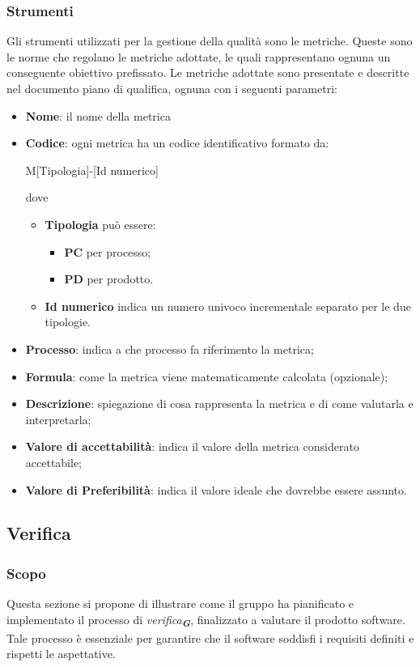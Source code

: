\subsubsection{Strumenti}
Gli strumenti utilizzati per la gestione della qualità sono le metriche.
Queste sono le norme che regolano le metriche adottate, le quali rappresentano ognuna un conseguente obiettivo prefissato.
Le metriche adottate sono presentate e descritte nel documento piano di qualifica, ognuna con i seguenti parametri:
\begin{itemize}
    \item \textbf{Nome}: il nome della metrica
    \item \textbf{Codice}: ogni metrica ha un codice identificativo formato da:
    \begin{center}
        M[Tipologia]-[Id numerico]
    \end{center}
    dove
    \begin{itemize}
        \item \textbf{Tipologia} può essere:
        \begin{itemize}
            \item \textbf{PC} per processo;
            \item \textbf{PD} per prodotto.
        \end{itemize}
        \item \textbf{Id numerico} indica un numero univoco incrementale separato per le due tipologie.
    \end{itemize}
    \item \textbf{Processo}: indica a che processo fa riferimento la metrica;
    \item \textbf{Formula}: come la metrica viene matematicamente calcolata (opzionale);
    \item \textbf{Descrizione}: spiegazione di cosa rappresenta la metrica e di come valutarla e interpretarla;
    \item \textbf{Valore di accettabilità}: indica il valore della metrica considerato accettabile;
    \item \textbf{Valore di Preferibilità}: indica il valore ideale che dovrebbe essere assunto.
\end{itemize}


\subsection{Verifica}
\label{sec:verifica}

\subsubsection{Scopo}
Questa sezione si propone di illustrare come il gruppo ha pianificato e implementato il processo di \emph{verifica}\textsubscript{\textit{\textbf{G}}}, finalizzato a valutare il prodotto software. Tale processo è essenziale per garantire che il software soddisfi i requisiti definiti e rispetti le aspettative. 

